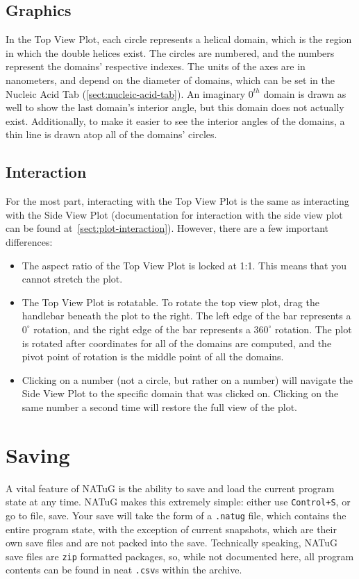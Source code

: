 \documentclass[titlepage]{article}
\begin{document}
\subsection{Graphics}
In the Top View Plot, each circle represents a helical domain, which is the region in which the double helices exist. The circles are numbered, and the numbers represent the domains' respective indexes. The units of the axes are in nanometers, and depend on the diameter of domains, which can be set in the Nucleic Acid Tab (\ref{sect:nucleic-acid-tab}). An imaginary $0^{th}$ domain is drawn as well to show the last domain's interior angle, but this domain does not actually exist. Additionally, to make it easier to see the interior angles of the domains, a thin line is drawn atop all of the domains' circles.

\subsection{Interaction}
For the most part, interacting with the Top View Plot is the same as interacting with the Side View Plot (documentation for interaction with the side view plot can be found at~\ref{sect:plot-interaction}). However, there are a few important differences:
\begin{itemize}
	\item The aspect ratio of the Top View Plot is locked at 1:1. This means that you cannot stretch the plot.
	\item The Top View Plot is rotatable. To rotate the top view plot, drag the handlebar beneath the plot to the right. The left edge of the bar represents a $0^{\circ}$ rotation, and the right edge of the bar represents a $360^{\circ}$ rotation. The plot is rotated after coordinates for all of the domains are computed, and the pivot point of rotation is the middle point of all the domains.
	\item Clicking on a number (not a circle, but rather on a number) will navigate the Side View Plot to the specific domain that was clicked on. Clicking on the same number a second time will restore the full view of the plot.
\end{itemize}

\section{Saving}

A vital feature of NATuG is the ability to save and load the current program state at any time. NATuG makes this extremely simple: either use \texttt{Control+S}, or go to file, save. Your save will take the form of a \texttt{.natug} file, which contains the entire program state, with the exception of current snapshots, which are their own save files and are not packed into the save. Technically speaking, NATuG save files are \texttt{zip} formatted packages, so, while not documented here, all program contents can be found in neat \texttt{.csv}s within the archive.
\end{document}
